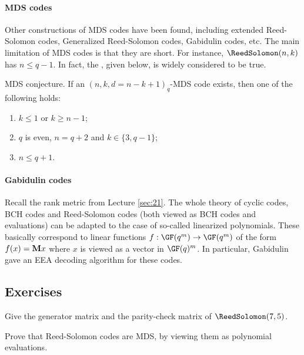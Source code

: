 \documentclass[a4paper, 11pt, openany]{book}
\begin{document}
\paragraph{MDS codes}
Other constructions of MDS codes have been found, including extended Reed-Solomon codes, Generalized Reed-Solomon codes, Gabidulin codes, etc. The main limitation of MDS codes is that they are short. For instance, $\ReedSolomon(n,k)$ has $n \le q-1$. In fact, the , given below, is widely considered to be true.

MDS conjecture. If an $(n,k,d = n - k + 1)_q$-MDS code exists, then one of the following holds:
\begin{enumerate}
	\item $k \le 1$ or $k \ge n-1$;

	\item $q$ is even, $n = q+2$ and $k \in \{3, q-1\}$;

	\item $n \le q+1$.
\end{enumerate}

\paragraph{Gabidulin codes}
Recall the rank metric from Lecture \ref{sec:21}. The whole theory of cyclic codes, BCH codes and Reed-Solomon codes (both viewed as BCH codes and evaluations) can be adapted to the case of so-called linearized polynomials. These basically correspond to linear functions $f : \GF(q^m) \to \GF(q^m)$ of the form $f(x) =  {\bf M}x$ where $x$ is viewed as a vector in $\GF(q)^m$. In particular, Gabidulin gave an EEA decoding algorithm for these codes.







\subsection{Exercises}

\begin{exercise}
Give the generator matrix and the parity-check matrix of $\ReedSolomon(7,5)$.
\end{exercise}



\begin{exercise} \label{q:RS_MDS}
Prove that Reed-Solomon codes are MDS, by viewing them as polynomial evaluations.
\end{exercise}
\end{document}
